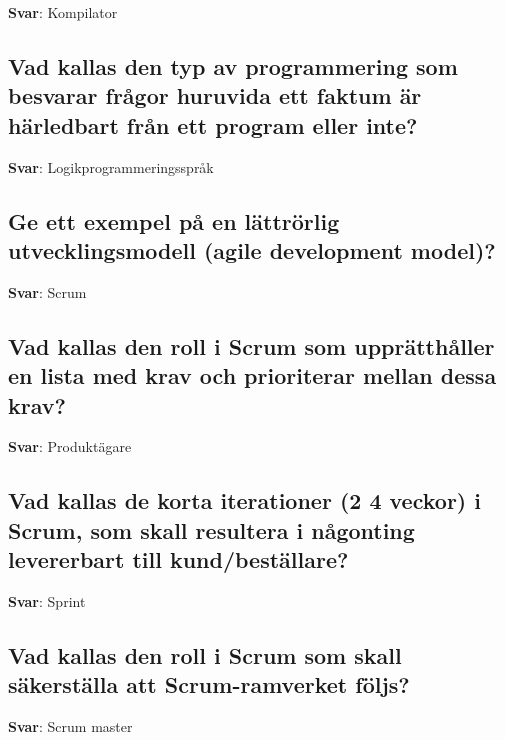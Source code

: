 \documentclass[a4paper,11pt,oneside]{article}
\begin{document}
\begin{sloppypar}
\label{q:38:sa:sv:True}

\textbf{Svar}: Kompilator



\subsection{Vad kallas den typ av programmering som besvarar fr\r{a}gor huruvida ett faktum \"ar h\"arledbart fr\r{a}n ett program eller inte?}

\label{q:39:sa:sv:True}

\textbf{Svar}: Logikprogrammeringsspr\r{a}k



\subsection{Ge ett exempel p\r{a} en l\"attr\"orlig utvecklingsmodell (agile development model)?}

\label{q:40:sa:sv:True}

\textbf{Svar}: Scrum



\subsection{Vad kallas den roll i Scrum som uppr\"atth\r{a}ller en lista med krav och prioriterar mellan dessa krav?}

\label{q:41:sa:sv:True}

\textbf{Svar}: Produkt\"agare



\subsection{Vad kallas de korta iterationer (2 {\textendash} 4 veckor) i Scrum, som skall resultera i n\r{a}gonting levererbart till kund/best\"allare?}

\label{q:42:sa:sv:True}

\textbf{Svar}: Sprint



\subsection{Vad kallas den roll i Scrum som skall s\"akerst\"alla att Scrum-ramverket f\"oljs?}

\label{q:43:sa:sv:True}

\textbf{Svar}: Scrum master




\end{sloppypar}
\end{document}
